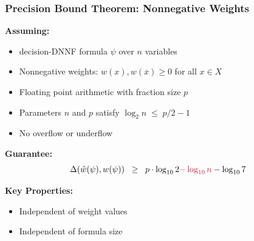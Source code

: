 \documentclass[t,pdf]{beamer}
\newcommand{\obar}[1]{\overline{#1}}
\newcommand{\approximate}[1]{\hat{#1}}
\newcommand{\approxw}{\approximate{w}}
\newcommand{\digitprecision}{\Delta}
\newcommand{\rtext}[1]{\textcolor{xred}{#1}}
\begin{document}
\begin{frame}
  \frametitle{Precision Bound Theorem: Nonnegative Weights}

\bigskip

  \textbf{Assuming:}
  \begin{itemize}
  \item decision-DNNF formula $\psi$ over $n$ variables
  \item Nonnegative weights: $w(x), w(\obar{x}) \geq 0$ for all $x \in X$
  \item Floating point arithmetic with fraction size $p$
  \item Parameters $n$ and $p$ satisfy $\log_2 n \;\leq\; p/2-1$
  \item No overflow or underflow
  \end{itemize}

\medskip

\textbf{Guarantee:}
\begin{displaymath}
\digitprecision(\approxw(\psi), w(\psi)) \;\; \geq \;\; p \cdot \log_{10}2 \rtext{- \log_{10}n} - \log_{10} 7
\end{displaymath}

\textbf{Key Properties:}
\begin{itemize}
\item Independent of weight values
\item Independent of formula size
\end{itemize}
\end{frame}
\end{document}
